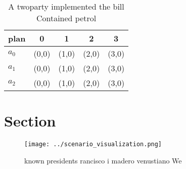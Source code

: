\documentclass[a4paper]{article}
\begin{document}
\begin{table}
\begin{adjustbox}{width=0.6\columnwidth}
\begin{tabular}{|l|l|l|l|l|}
\hline
\textbf{plan} & \multicolumn{1}{c|}{\textbf{0}} & \multicolumn{1}{c|}{\textbf{1}} & \multicolumn{1}{c|}{\textbf{2}} & \multicolumn{1}{c|}{\textbf{3}} \\ \hline
\textbf{$a_0$}  & (0,0) & (1,0) & (2,0) & (3,0) \\ \hline
\textbf{$a_1$}  & (0,0) & (1,0) & (2,0) & (3,0) \\ \hline
\textbf{$a_2$}  & (0,0) & (1,0) & (2,0) & (3,0) \\ \hline
\end{tabular}
\end{adjustbox}
\caption{A twoparty implemented the bill Contained petrol 
}
\end{table}

\section{Section}

\begin{figure}
\centering
\texttt{[image: ../scenario\_visualization.png]}
\caption{ known presidents rancisco i madero venustiano We
}
\end{figure}
 
\end{document}
